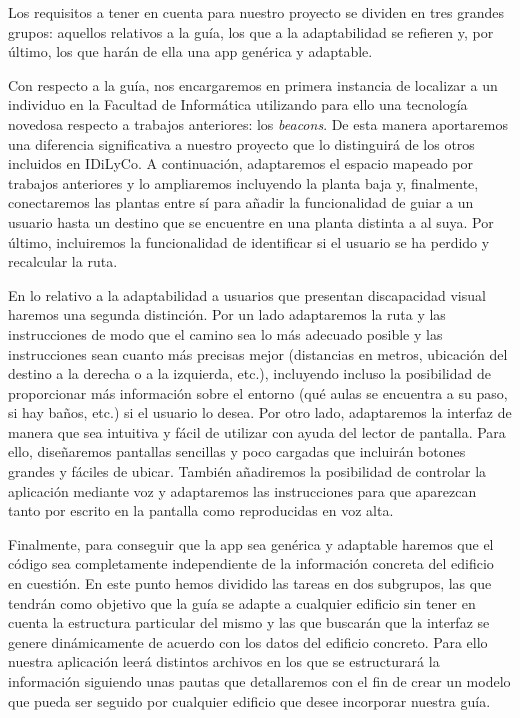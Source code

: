 Los requisitos a tener en cuenta para nuestro proyecto se dividen en tres grandes grupos: aquellos relativos a la guía, los que a la adaptabilidad se refieren y, por último, los que harán de ella una app genérica y adaptable.

Con respecto a la guía, nos encargaremos en primera instancia de localizar a un individuo en la Facultad de Informática utilizando para ello una tecnología novedosa respecto a trabajos anteriores: los \textit{beacons}. De esta manera aportaremos una diferencia significativa a nuestro proyecto que lo distinguirá de los otros incluidos en IDiLyCo. A continuación, adaptaremos el espacio mapeado por trabajos anteriores y lo ampliaremos incluyendo la planta baja y, finalmente, conectaremos las plantas entre sí para añadir la funcionalidad de guiar a un usuario hasta un destino que se encuentre en una planta distinta a al suya. Por último, incluiremos la funcionalidad de identificar si el usuario se ha perdido y recalcular la ruta.

En lo relativo a la adaptabilidad a usuarios que presentan discapacidad visual haremos una segunda distinción. Por un lado adaptaremos la ruta y las instrucciones de modo que el camino sea lo más adecuado posible y las instrucciones sean cuanto más precisas mejor (distancias en metros, ubicación del destino a la derecha o a la izquierda, etc.), incluyendo incluso la posibilidad de proporcionar más información sobre el entorno (qué aulas se encuentra a su paso, si hay baños, etc.) si el usuario lo desea. Por otro lado, adaptaremos la interfaz de manera que sea intuitiva y fácil de utilizar con ayuda del lector de pantalla. Para ello, diseñaremos pantallas sencillas y poco cargadas que incluirán botones grandes y fáciles de ubicar. También añadiremos la posibilidad de controlar la aplicación mediante voz y adaptaremos las instrucciones para que aparezcan tanto por escrito en la pantalla como reproducidas en voz alta.

Finalmente, para conseguir que la app sea genérica y adaptable haremos que el código sea completamente independiente de la información concreta del edificio en cuestión. En este punto hemos dividido las tareas en dos subgrupos, las que tendrán como objetivo que la guía se adapte a cualquier edificio sin tener en cuenta la estructura particular del mismo y las que buscarán que la interfaz se genere dinámicamente de acuerdo con los datos del edificio concreto. Para ello nuestra aplicación leerá distintos archivos en los que se estructurará la información siguiendo unas pautas que detallaremos con el fin de crear un modelo que pueda ser seguido por cualquier edificio que desee incorporar nuestra guía.

